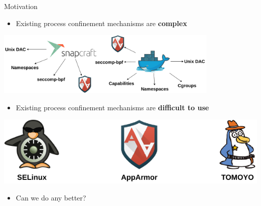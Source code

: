 \documentclass[12pt, dvipsnames, aspectratio=169]{beamer}
\begin{document}
\begin{frame}[c]{Motivation}
\begin{itemize}
    \item Existing process confinement mechanisms are \textbf{complex}
\end{itemize}
\begin{center}
    \color{black}
    \includegraphics[width=0.8\textwidth]{figs/process-confinement-landscape.pdf}
\end{center}
\begin{itemize}
    \item Existing process confinement mechanisms are \textbf{difficult to use}
\end{itemize}
\begin{center}
    \color{black}
    \includegraphics[height=0.2\textheight]{figs/mac.pdf}
\end{center}
\begin{itemize}
    \item Can we do any better?
\end{itemize}
\end{frame}
\end{document}
